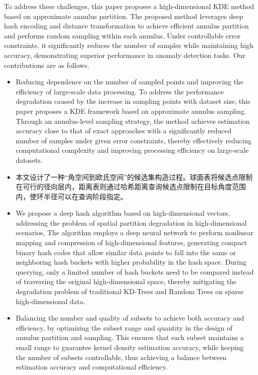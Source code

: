\documentclass[conference]{IEEEtran}
\begin{document}
To address these challenges, this paper proposes a high-dimensional KDE method based on approximate annulus partition.
The proposed method leverages deep hash encoding and distance transformation to achieve efficient annulus partition and performs random sampling within each annulus. Under controllable error constraints, it significantly reduces the number of samples while maintaining high accuracy, demonstrating superior performance in anomaly detection tasks. Our contributions are as follows. 
\begin{itemize}
 \item Reducing dependence on the number of sampled points and improving the efficiency of large-scale data processing.
To address the performance degradation caused by the increase in sampling points with dataset size, this paper proposes a KDE framework based on approximate annulus sampling.
Through an annulus-level sampling strategy, the method achieves estimation accuracy close to that of exact approaches with a significantly reduced number of samples under given error constraints, thereby effectively reducing computational complexity and improving processing efficiency on large-scale datasets.

 \item 本文设计了一种“角空间到欧氏空间”的候选集构造过程。球面表将候选点限制在可行的径向层内，距离表则通过哈希距离查询候选点限制在目标角度范围内，使环半径可以在查询阶段指定。
 \item  We propose a deep hash algorithm based on high-dimensional vectors, addressing the problem of spatial partition degradation in high-dimensional scenarios,
The algorithm employs a deep neural network to perform nonlinear mapping and compression of high-dimensional features, generating compact binary hash codes that allow similar data points to fall into the same or neighboring hash buckets with higher probability in the hash space.
During querying, only a limited number of hash buckets need to be compared instead of traversing the original high-dimensional space, thereby mitigating the degradation problem of traditional KD-Trees and Random Trees on sparse high-dimensional data.


 \item  Balancing the number and quality of subsets to achieve both accuracy and efficiency, by optimizing the subset range and quantity in the design of annulus partition and sampling.
This ensures that each subset maintains a small range to guarantee kernel density estimation accuracy, while keeping the number of subsets controllable, thus achieving a balance between estimation accuracy and computational efficiency.
\end{itemize}
\end{document}
